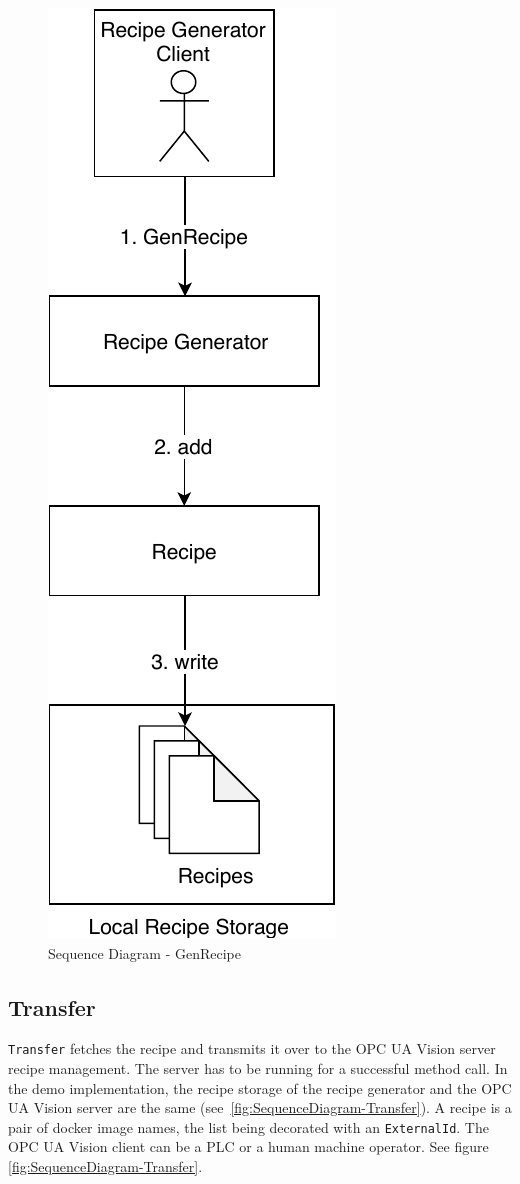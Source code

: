 \begin{figure}[ht]
	\centering
  \includegraphics[height=0.5\textheight]{img/SequenceDiagram-GenRecipe.pdf}
	\caption{Sequence Diagram - GenRecipe}
	\label{fig:SequenceDiagram-GenRecipe}
\end{figure}

\subsection{Transfer}
\texttt{Transfer} fetches the recipe and transmits it over to the OPC UA Vision server recipe management. The server has to be running for a successful method call. In the demo implementation, the recipe storage of the recipe generator and the OPC UA Vision server are the same (see~\ref{fig:SequenceDiagram-Transfer}). A recipe is a pair of docker image names, the list being decorated with an \texttt{ExternalId}. The OPC UA Vision client can be a PLC or a human machine operator. See figure \ref{fig:SequenceDiagram-Transfer}.

